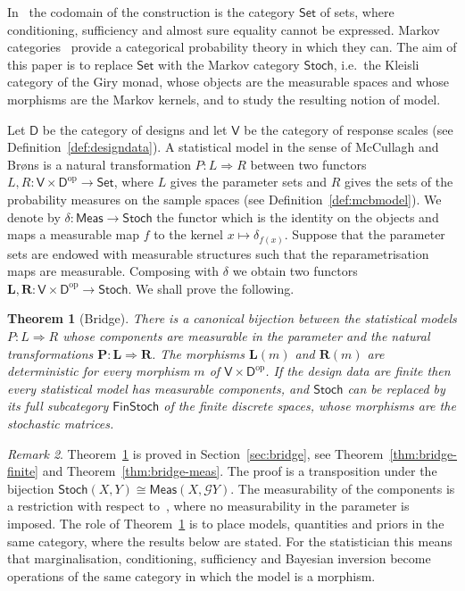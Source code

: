 \documentclass[11pt,a4paper]{article}
\theoremstyle{plain}
\newtheorem{theorem}{Theorem}[section]
\theoremstyle{definition}
\theoremstyle{remark}
\newtheorem{remark}[theorem]{Remark}
\newcommand{\cat}[1]{\mathsf{#1}}
\newcommand{\catV}{\cat{V}}
\newcommand{\catD}{\cat{D}}
\newcommand{\Meas}{\cat{Meas}}
\newcommand{\Set}{\cat{Set}}
\newcommand{\Stoch}{\cat{Stoch}}
\newcommand{\FinStoch}{\cat{FinStoch}}
\newcommand{\G}{\mathcal{G}}
\newcommand{\op}{\mathrm{op}}
\newcommand{\del}{\delta}
\begin{document}
In~\cite{mccullagh_what_2002} the codomain of the construction is the category
$\Set$ of sets, where conditioning, sufficiency and almost sure equality cannot
be expressed. Markov
categories~\cite{fritz_synthetic_2020,cho_disintegration_2019,perrone_markov_2024,fritz_definetti_2021}
provide a categorical probability theory in which they can. The aim of this
paper is to replace $\Set$ with the Markov category $\Stoch$, i.e.\ the Kleisli
category of the Giry monad, whose objects are the measurable spaces and whose
morphisms are the Markov kernels, and to study the resulting notion of model.

Let $\catD$ be the category of designs and let $\catV$ be the category of
response scales (see Definition~\ref{def:designdata}). A statistical model in
the sense of McCullagh and Br\o ns is a natural transformation
$P \colon L \Rightarrow R$ between two functors
$L, R \colon \catV \times \catD^{\op} \to \Set$, where $L$ gives the parameter
sets and $R$ gives the sets of the probability measures on the sample spaces
(see Definition~\ref{def:mcbmodel}). We denote by
$\del \colon \Meas \to \Stoch$ the functor which is the identity on the objects
and maps a measurable map $f$ to the kernel $x \mapsto \delta_{f(x)}$. Suppose
that the parameter sets are endowed with measurable structures such that the
reparametrisation maps are measurable. Composing with $\del$ we obtain two
functors $\mathbf{L}, \mathbf{R} \colon \catV \times \catD^{\op} \to \Stoch$.
We shall prove the following.

\begin{theorem}[Bridge]\label{thm:main}
There is a canonical bijection between the statistical models
$P \colon L \Rightarrow R$ whose components are measurable in the parameter
and the natural transformations
$\mathbf{P} \colon \mathbf{L} \Rightarrow \mathbf{R}$. The morphisms
$\mathbf{L}(m)$ and $\mathbf{R}(m)$ are deterministic for every morphism $m$ of
$\catV \times \catD^{\op}$. If the design data are finite then every
statistical model has measurable components, and $\Stoch$ can be replaced by
its full subcategory $\FinStoch$ of the finite discrete spaces, whose
morphisms are the stochastic matrices.
\end{theorem}

\begin{remark}\label{rem:main}
Theorem~\ref{thm:main} is proved in Section~\ref{sec:bridge}, see
Theorem~\ref{thm:bridge-finite} and Theorem~\ref{thm:bridge-meas}. The proof
is a transposition under the bijection
$\Stoch(X,Y) \cong \Meas(X,\G Y)$. The measurability of the components is a
restriction with respect to~\cite{mccullagh_what_2002}, where no measurability
in the parameter is imposed. The role of Theorem~\ref{thm:main} is to place
models, quantities and priors in the same category, where the results below
are stated. For the statistician this means that marginalisation,
conditioning, sufficiency and Bayesian inversion become operations of the same
category in which the model is a morphism.
\end{remark}
\end{document}
